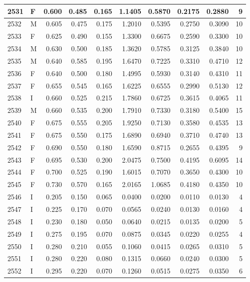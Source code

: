 \documentclass[9pt,twocolumn,twoside,]{pnas-new}
\begin{document}
\begin{tabular}{l|l|r|r|r|r|r|r|r|r}
\hline
2531 & F & 0.600 & 0.485 & 0.165 & 1.1405 & 0.5870 & 0.2175 & 0.2880 & 9\\
\hline
2532 & M & 0.605 & 0.475 & 0.175 & 1.2010 & 0.5395 & 0.2750 & 0.3090 & 10\\
\hline
2533 & F & 0.625 & 0.490 & 0.155 & 1.3300 & 0.6675 & 0.2590 & 0.3300 & 10\\
\hline
2534 & M & 0.630 & 0.500 & 0.185 & 1.3620 & 0.5785 & 0.3125 & 0.3840 & 10\\
\hline
2535 & M & 0.640 & 0.585 & 0.195 & 1.6470 & 0.7225 & 0.3310 & 0.4710 & 12\\
\hline
2536 & F & 0.640 & 0.500 & 0.180 & 1.4995 & 0.5930 & 0.3140 & 0.4310 & 11\\
\hline
2537 & F & 0.655 & 0.545 & 0.165 & 1.6225 & 0.6555 & 0.2990 & 0.5130 & 12\\
\hline
2538 & I & 0.660 & 0.525 & 0.215 & 1.7860 & 0.6725 & 0.3615 & 0.4065 & 11\\
\hline
2539 & M & 0.660 & 0.535 & 0.200 & 1.7910 & 0.7330 & 0.3180 & 0.5400 & 15\\
\hline
2540 & F & 0.675 & 0.555 & 0.205 & 1.9250 & 0.7130 & 0.3580 & 0.4535 & 13\\
\hline
2541 & F & 0.675 & 0.550 & 0.175 & 1.6890 & 0.6940 & 0.3710 & 0.4740 & 13\\
\hline
2542 & F & 0.690 & 0.550 & 0.180 & 1.6590 & 0.8715 & 0.2655 & 0.4395 & 9\\
\hline
2543 & F & 0.695 & 0.530 & 0.200 & 2.0475 & 0.7500 & 0.4195 & 0.6095 & 14\\
\hline
2544 & F & 0.700 & 0.525 & 0.190 & 1.6015 & 0.7070 & 0.3650 & 0.4300 & 10\\
\hline
2545 & F & 0.730 & 0.570 & 0.165 & 2.0165 & 1.0685 & 0.4180 & 0.4350 & 10\\
\hline
2546 & I & 0.205 & 0.150 & 0.065 & 0.0400 & 0.0200 & 0.0110 & 0.0130 & 4\\
\hline
2547 & I & 0.225 & 0.170 & 0.070 & 0.0565 & 0.0240 & 0.0130 & 0.0160 & 4\\
\hline
2548 & I & 0.230 & 0.180 & 0.050 & 0.0640 & 0.0215 & 0.0135 & 0.0200 & 5\\
\hline
2549 & I & 0.275 & 0.195 & 0.070 & 0.0875 & 0.0345 & 0.0220 & 0.0255 & 4\\
\hline
2550 & I & 0.280 & 0.210 & 0.055 & 0.1060 & 0.0415 & 0.0265 & 0.0310 & 5\\
\hline
2551 & I & 0.280 & 0.220 & 0.080 & 0.1315 & 0.0660 & 0.0240 & 0.0300 & 5\\
\hline
2552 & I & 0.295 & 0.220 & 0.070 & 0.1260 & 0.0515 & 0.0275 & 0.0350 & 6\\

\end{tabular}
\end{document}
